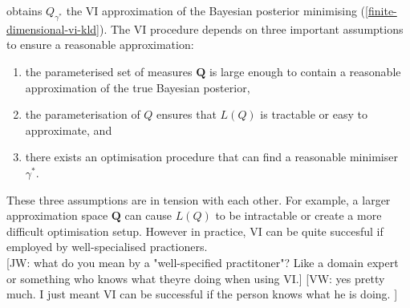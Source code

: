 \documentclass{article}
\newcommand{\jw}[1]{{\color{gray} [JW: #1]}}
\newcommand{\vw}[1]{{\color{green} [VW: #1]}}
\numberwithin{equation}{section}
\begin{document}
obtains $Q_{\gamma^*}$ the VI approximation of the Bayesian posterior minimising (\ref{finite-dimensional-vi-kld}). The VI procedure depends on three important assumptions to ensure a reasonable approximation:
\begin{enumerate}
    \item the parameterised set of measures $\boldsymbol{Q}$ is large enough to contain a reasonable approximation of the true Bayesian posterior,
    \item the parameterisation of $Q$ ensures that $L(Q)$ is tractable or easy to approximate, and
    \item there exists an optimisation procedure that can find a reasonable minimiser $\gamma^*$.
\end{enumerate}
These three assumptions are in tension with each other. 
For example, a larger approximation space $\boldsymbol{Q}$ can cause $L(Q)$ to be intractable or create a more difficult optimisation setup.
However in practice, VI can be quite succesful if employed by well-specialised practioners.
\\\jw{what do you mean by a "well-specified practitoner"? Like a domain expert or something who knows what theyre doing when using VI.}
\vw{yes pretty much. I just meant VI can be successful if the person knows what he is doing. }
\end{document}
